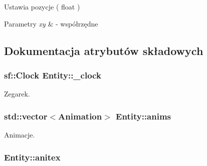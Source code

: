 Ustawia pozycje ( float ) 


\begin{DoxyParams}{Parametry}
{\em xy} & -\/ współrzędne \\
\hline
\end{DoxyParams}


\subsection{Dokumentacja atrybutów składowych}
\hypertarget{class_entity_a371e5de242da644dca5e90674eb0c1bc}{
\subsubsection[{\-\_\-clock}]{\setlength{\rightskip}{0pt plus 5cm}sf\-::\-Clock Entity\-::\-\_\-clock\hspace{0.3cm}{\ttfamily [protected]}}}\label{class_entity_a371e5de242da644dca5e90674eb0c1bc}


Zegarek. 


\begin{DoxyItemize}
\item 
\end{DoxyItemize}\hypertarget{class_entity_adca44d97840ac7cff2d91d4d518edbcf}{
\subsubsection[{anims}]{\setlength{\rightskip}{0pt plus 5cm}std\-::vector$<${\bf Animation}$>$ Entity\-::anims\hspace{0.3cm}{\ttfamily [protected]}}}\label{class_entity_adca44d97840ac7cff2d91d4d518edbcf}


Animacje. 


\begin{DoxyItemize}
\item 
\end{DoxyItemize}\hypertarget{class_entity_ad968b2c732af4a7087842f31202438fc}{
\subsubsection[{anitex}]{ Entity\-::anitex\hspace{0.3cm}{\ttfamily [protected]}}}\label{class_entity_ad968b2c732af4a7087842f31202438fc}



